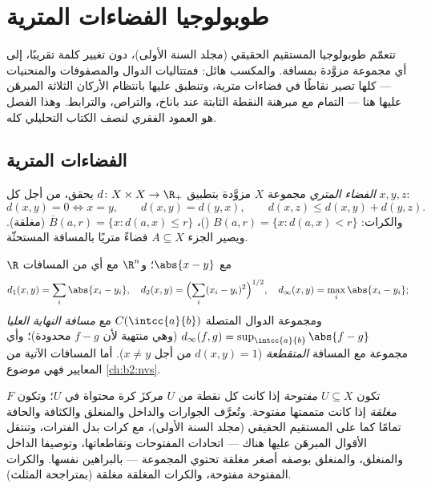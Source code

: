 \chapter{طوبولوجيا الفضاءات المترية}\label{ch:b2:metric}

تتعمّم طوبولوجيا المستقيم الحقيقي (مجلد السنة الأولى)، دون تغيير
كلمة تقريبًا، إلى أي مجموعة مزوَّدة بمسافة. والمكسب هائل:
فمتتاليات الدوال والمصفوفات والمنحنيات --- كلها تصير نقاطًا في
فضاءات مترية، وتنطبق عليها بانتظام الأركان الثلاثة المبرهَن عليها
هنا --- التمام مع مبرهنة النقطة الثابتة عند باناخ، والتراص،
والترابط. وهذا الفصل هو العمود الفقري لنصف الكتاب التحليلي كله.

\section{الفضاءات المترية}

\begin{definition}\label{def:b2:metric:def}
\emph{الفضاء المتري} مجموعة $X$ مزوَّدة بتطبيق $d
\colon X \times X \to \R_+$ يحقق، من أجل كل $x, y, z$:
\[
d(x,y) = 0 \iff x = y,
\qquad
d(x,y) = d(y,x),
\qquad
d(x,z) \leq d(x,y) + d(y,z).
\]
والكرات: $B(a, r) = \{x : d(a,x) < r\}$ ()، $\overline B(a,r) =
\{x : d(a,x) \leq r\}$ (مغلقة). ويصير الجزء $A \subseteq X$
فضاءً متريًا بالمسافة المستحثّة.
\end{definition}

\begin{example}\label{ex:b2:metric:examples}
$\R$ مع $\abs{x - y}$؛ و$\R^n$ مع أي من المسافات
\[
d_1(x,y) = \sum_i \abs{x_i - y_i},
\quad
d_2(x,y) = \Bigl(\sum_i (x_i - y_i)^2\Bigr)^{1/2},
\quad
d_\infty(x,y) = \max_i \abs{x_i - y_i};
\]
ومجموعة الدوال المتصلة $C(\intcc{a}{b})$ مع
\emph{مسافة النهاية العليا} $d_\infty(f, g) = \sup_{\intcc{a}{b}} \abs{f -
g}$ (وهي منتهية لأن $f - g$ محدودة)؛ وأي مجموعة مع المسافة
\emph{المتقطعة} ($d(x,y) = 1$ من أجل $x \neq y$). أما المسافات الآتية من
المعايير فهي موضوع \cref{ch:b2:nvs}.
\end{example}

\begin{definition}\label{def:b2:metric:topology}
تكون $U \subseteq X$ \emph{مفتوحة}
إذا كانت كل نقطة من $U$ مركزَ كرة محتواة في $U$؛
وتكون $F$ \emph{مغلقة} إذا كانت متممتها مفتوحة. وتُعرَّف الجوارات
والداخل والمنغلق والكثافة والحافة تمامًا كما على المستقيم
الحقيقي (مجلد السنة الأولى)، مع كرات بدل الفترات، وتنتقل الأقوال
المبرهَن عليها هناك --- اتحادات المفتوحات وتقاطعاتها،
وتوصيفا الداخل والمنغلق، والمنغلق بوصفه أصغر مغلقة تحتوي المجموعة ---
بالبراهين نفسها. والكرات المفتوحة مفتوحة، والكرات المغلقة مغلقة
(بمتراجحة المثلث).
\end{definition}

